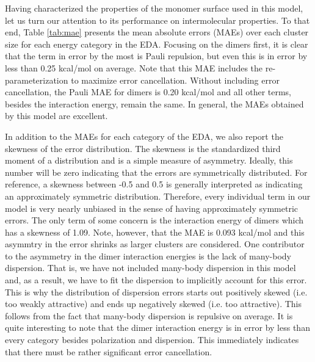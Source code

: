 \documentclass[journal=jctcce,manuscript=article]{achemso}
\begin{document}
Having characterized the properties of the monomer surface used in this model, let us turn our attention to its performance on intermolecular properties. To that end, Table \ref{tab:mae} presents the mean absolute errors (MAEs) over each cluster size for each energy category in the EDA. Focusing on the dimers first, it is clear that the term in error by the most is Pauli repulsion, but even this is in error by less than 0.25 kcal/mol on average. Note that this MAE includes the re-parameterization to maximize error cancellation. Without including error cancellation, the Pauli MAE for dimers is 0.20 kcal/mol and all other terms, besides the interaction energy, remain the same. In general, the MAEs obtained by this model are excellent.

In addition to the MAEs for each category of the EDA, we also report the skewness of the error distribution. The skewness is the standardized third moment of a distribution and is a simple measure of asymmetry. Ideally, this number will be zero indicating that the errors are symmetrically distributed. For reference, a skewness between -0.5 and 0.5 is generally interpreted as indicating an approximately symmetric distribution. Therefore, every individual term in our model is very nearly unbiased in the sense of having approximately symmetric errors. The only term of some concern is the interaction energy of dimers which has a skewness of 1.09. Note, however, that the MAE is 0.093 kcal/mol and this asymmtry in the error shrinks as larger clusters are considered. One contributor to the asymmetry in the dimer interaction energies is the lack of many-body dispersion. That is, we have not included many-body dispersion in this model and, as a result, we have to fit the dispersion to implicitly account for this error. This is why the distribution of dispersion errors starts out positively skewed (i.e. too weakly attractive) and ends up negatively skewed (i.e. too attractive). This follows from the fact that many-body dispersion is repulsive on average. It is quite interesting to note that the dimer interaction energy is in error by less than every category besides polarization and dispersion. This immediately indicates that there must be rather significant error cancellation.
\end{document}
